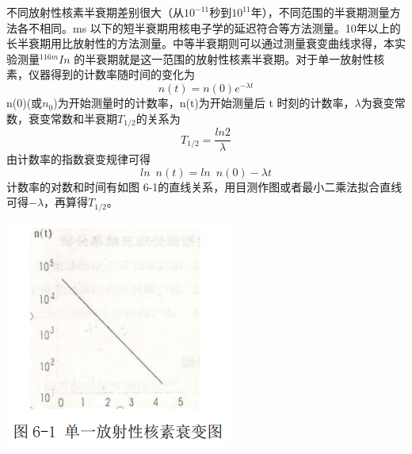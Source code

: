\documentclass[hyperref]{ctexart}
\begin{document}
\begin{multicols}{2}
	不同放射性核素半衰期差别很大（从$10^{-11}$秒到$10^{11}$年），不同范围的半衰期测量方法各不相同。ms 以下的短半衰期用核电子学的延迟符合等方法测量。10年以上的长半衰期用比放射性的方法测量。中等半衰期则可以通过测量衰变曲线求得，本实验测量$^{116m}In$ 的半衰期就是这一范围的放射性核素半衰期。对于单一放射性核素，仪器得到的计数率随时间的变化为
	\begin{equation}
	n(t) = n(0)e^{-\lambda t}
	\end{equation}	
	n(0)(或$n_0$)为开始测量时的计数率，n(t)为开始测量后 t 时刻的计数率，$\lambda$为衰变常数，衰变常数和半衰期$T_{1/2}$的关系为
	\begin{equation}
	T_{1/2}=\frac{ln2}{\lambda}\label{chu}
	\end{equation}
	由计数率的指数衰变规律可得
	\begin{equation}
	ln\enspace n(t)=ln\enspace n(0)-\lambda t
	\end{equation}
	计数率的对数和时间有如图 6-1的直线关系，用目测作图或者最小二乘法拟合直线可得$-\lambda$，再算得$T_{1/2}$。
	\begin{center}\includegraphics[scale=0.5]{t61}\end{center}


\end{multicols}
\end{document}
